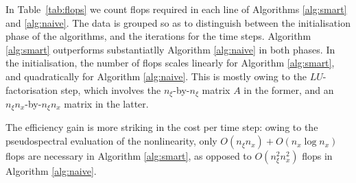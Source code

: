 \documentclass[a4paper,final]{siamart190516}
\begin{document}
In Table~\ref{tab:flops} we count flops required in each line of Algorithms
\ref{alg:smart} and \ref{alg:naive}. The data is grouped so as to distinguish between
the initialisation phase of the algorithms, and the iterations for the time steps.
Algorithm \ref{alg:smart} outperforms substantiatlly Algorithm \ref{alg:naive} in
both phases. In the initialisation, the number of flops scales linearly for Algorithm
\ref{alg:smart}, and quadratically for Algorithm \ref{alg:naive}. This is mostly
owing to the $LU$-factorisation step, which involves the $n_\xi$-by-$n_\xi$ matrix
$A$ in the former, and an $n_\xi n_x$-by-$n_\xi n_x$ matrix in the latter. 

The efficiency gain is more striking in the cost per time step: owing to the
pseudospectral evaluation of the nonlinearity, only $O(n_\xi n_x) + O(n_x \log n_x)$
flops are necessary in Algorithm \ref{alg:smart}, as opposed to $O(n^2_\xi n^2_x)$
flops in Algorithm \ref{alg:naive}.
\end{document}
